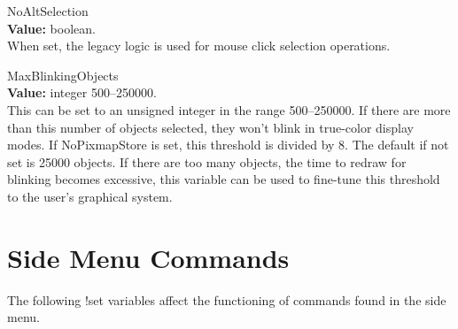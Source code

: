 \begin{description}
\item{\et NoAltSelection}\\
{\bf Value:} boolean.\\
When set, the legacy logic is used for mouse click selection
operations.

\item{\et MaxBlinkingObjects}\\
{\bf Value:} integer 500--250000.\\
This can be set to an unsigned integer in the range 500--250000.  If
there are more than this number of objects selected, they won't blink
in true-color display modes.  If {\et NoPixmapStore} is set, this
threshold is divided by 8.  The default if not set is 25000 objects. 
If there are too many objects, the time to redraw for blinking becomes
excessive, this variable can be used to fine-tune this threshold to
the user's graphical system.
\end{description}


\section{Side Menu Commands}

The following {\cb !set} variables affect the functioning of
commands found in the side menu.

